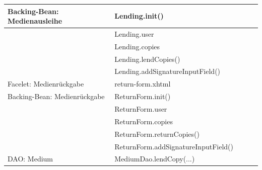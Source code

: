 \documentclass{article}
\begin{document}
\begin{longtable}{|l|l|l|l|l|}
\hline
Backing-Bean: Medienausleihe            & Lending.init()                           &                           &                             &                        \\ 
\hline
                                        & Lending.user                             &                           &                             &                        \\ 
\hline
                                        & Lending.copies                           &                           &                             &                        \\ 
\hline
                                        & Lending.lendCopies()                     &                           &                             &                        \\ 
\hline
                                        & Lending.addSignatureInputField()         &                           &                             &                        \\ 
\hline
Facelet: Medienrückgabe                 & return-form.xhtml                        &                           &                             &                        \\ 
\hline
Backing-Bean: Medienrückgabe            & ReturnForm.init()                        &                           &                             &                        \\ 
\hline
                                        & ReturnForm.user                          &                           &                             &                        \\ 
\hline
                                        & ReturnForm.copies                        &                           &                             &                        \\ 
\hline
                                        & ReturnForm.returnCopies()                &                           &                             &                        \\ 
\hline
                                        & ReturnForm.addSignatureInputField()      &                           &                             &                        \\ 
\hline
DAO: Medium                             & MediumDao.lendCopy(...)                  &                           &                             &                        \\ 

\end{longtable}
\end{document}
